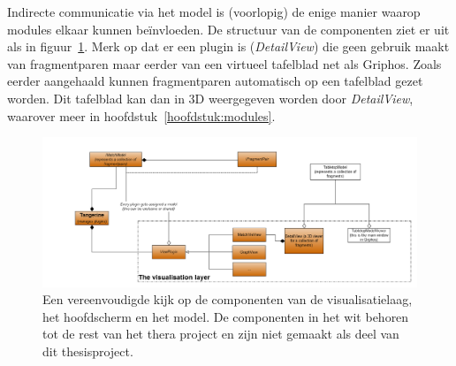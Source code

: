 Indirecte communicatie via het model is (voorlopig) de enige manier waarop modules elkaar kunnen be\"invloeden. De structuur van de componenten ziet er uit als in figuur~\ref{fig:visualizationlayer}. Merk op dat er een plugin is (\emph{DetailView}) die geen gebruik maakt van fragmentparen maar eerder van een virtueel tafelblad net als Griphos. Zoals eerder aangehaald kunnen fragmentparen automatisch op een tafelblad gezet worden. Dit tafelblad kan dan in 3D weergegeven worden door \emph{DetailView}, waarover meer in hoofdstuk~\ref{hoofdstuk:modules}.

\begin{figure}[h]
	\begin{center}
		\includegraphics[width=1.0\columnwidth]{images/VisualizationExtract.png}
		\caption{Een vereenvoudigde kijk op de componenten van de visualisatielaag, het hoofdscherm en het model. De componenten in het wit behoren tot de rest van het thera project en zijn niet gemaakt als deel van dit thesisproject.}
		\label{fig:visualizationlayer}
	\end{center}
\end{figure}